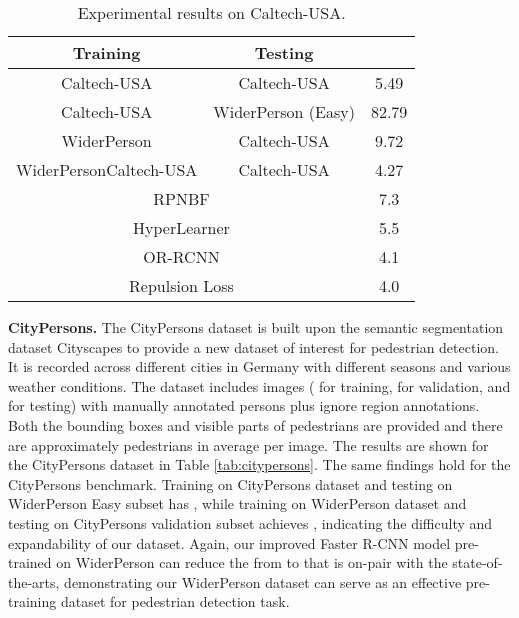 \documentclass[journal]{IEEEtran}
\begin{document}
\begin{table}[t]
\begin{center}
\caption{Experimental results on Caltech-USA.}
\label{tab:caltech-usa}
\setlength{\tabcolsep}{13pt}
\begin{tabular}{ccc}
\toprule[2pt]
{Training} & {Testing} &  \\
\hline
Caltech-USA & Caltech-USA & {5.49}\\
Caltech-USA & WiderPerson (Easy) & {82.79}\\
WiderPerson & Caltech-USA & {9.72}\\
WiderPersonCaltech-USA & Caltech-USA & {4.27}\\
\hline
\hline
\multicolumn{2}{c}{RPNBF~\cite{DBLP:conf/eccv/ZhangLLH16}} &7.3\\
\multicolumn{2}{c}{HyperLearner~\cite{DBLP:conf/cvpr/MaoXJC17}} &5.5\\
\multicolumn{2}{c}{OR-RCNN~\cite{zhang2018occlusion}} &4.1\\
\multicolumn{2}{c}{Repulsion Loss~\cite{DBLP:journals/corr/abs-1711-07752}} &4.0\\
\bottomrule[2pt]
\end{tabular}
\end{center}
\end{table}

{\flushleft \textbf{CityPersons. }}
The CityPersons dataset is built upon the semantic segmentation dataset Cityscapes to provide a new dataset of interest for pedestrian detection. It is recorded across  different cities in Germany with  different seasons and various weather conditions. The dataset includes  images ( for training,  for validation, and  for testing) with  manually annotated persons plus  ignore region annotations. Both the bounding boxes and visible parts of pedestrians are provided and there are approximately  pedestrians in average per image. The results are shown for the CityPersons dataset in Table \ref{tab:citypersons}. The same findings hold for the CityPersons benchmark. Training on CityPersons dataset and testing on WiderPerson Easy subset has  , while training on WiderPerson dataset and testing on CityPersons validation subset achieves  , indicating the difficulty and expandability of our dataset. Again, our improved Faster R-CNN model pre-trained on WiderPerson can reduce the  from  to  that is on-pair with the state-of-the-arts, demonstrating our WiderPerson dataset can serve as an effective pre-training dataset for pedestrian detection task.
\end{document}
